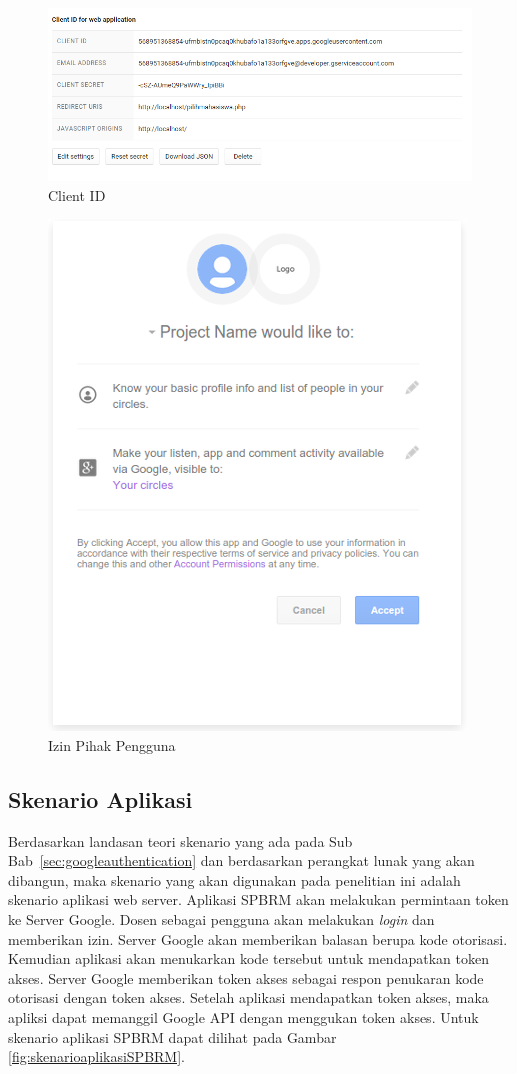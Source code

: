 \begin{figure}[ht]
\centering
\includegraphics[scale=0.5]{Gambar/clientid.png}
\caption[Client ID]{Client ID} 
\label{fig:clientid}
\end{figure}

\begin{figure}[ht]
\centering
\includegraphics[scale=0.5]{Gambar/izinpengguna.png}
\caption[Izin Pihak Pengguna]{Izin Pihak Pengguna} 
\label{fig:izinpengguna}
\end{figure}

\subsection{Skenario Aplikasi}
Berdasarkan landasan teori skenario yang ada pada Sub Bab~\ref{sec:googleauthentication} dan berdasarkan perangkat lunak yang akan dibangun, maka skenario yang akan digunakan pada penelitian ini adalah skenario aplikasi web server. Aplikasi SPBRM akan melakukan permintaan token ke Server Google. Dosen sebagai pengguna akan melakukan {\it login} dan memberikan izin. Server Google akan memberikan balasan berupa kode otorisasi. Kemudian aplikasi akan menukarkan kode tersebut untuk mendapatkan token akses. Server Google memberikan token akses sebagai respon penukaran kode otorisasi dengan token akses. Setelah aplikasi mendapatkan token akses, maka apliksi dapat memanggil Google API dengan menggukan token akses. Untuk skenario aplikasi SPBRM dapat dilihat pada Gambar \ref{fig:skenarioaplikasiSPBRM}.

